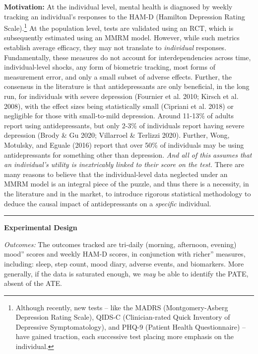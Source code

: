 \documentclass[12pt,letterpaper,doublespace, oneside]{article}
\begin{document}
\noindent\textbf{Motivation:} At the individual level, mental health is diagnosed by weekly tracking an individual’s responses to the HAM-D (Hamilton Depression Rating Scale).\footnote{Although recently, new tests -- like the MADRS (Montgomery-Asberg Depression Rating Scale), QIDS-C (Clinician-rated Quick Inventory of Depressive Symptomatology), and PHQ-9 (Patient Health Questionnaire) -- have gained traction, each successive test placing more emphasis on the individual.} At the population level, tests are validated using an RCT, which is subsequently estimated using an MMRM model. However, while such metrics establish average efficacy, they may not translate to \emph{individual} responses. Fundamentally, these measures do not account for interdependencies across time, individual-level shocks, any form of biometric tracking, most forms of measurement error, and only a small subset of adverse effects. Further, the consensus in the literature is that antidepressants are only beneficial, in the long run, for individuals with severe depression (Fournier et al. 2010; Kirsch et al. 2008), with the effect sizes being statistically small (Cipriani et al. 2018) or negligible for those with small-to-mild depression. Around 11-13\% of adults report using antidepressants, but only 2-3\% of individuals report having severe depression (Brody \& Gu 2020; Villarroel \& Terlizzi 2020). Further, Wong, Motulsky, and Eguale (2016) report that over 50\% of individuals may be using antidepressants for something other than depression. \emph{And all of this assumes that an individual’s utility is inextricably linked to their score on the test.} There are many reasons to believe that the individual-level data neglected under an MMRM model is an integral piece of the puzzle, and thus there is a necessity, in the literature and in the market, to introduce rigorous statistical methodology to deduce the causal impact of antidepressants on a \emph{specific} individual. 

\noindent\rule{\linewidth}{0.4pt}

\noindent
\textbf{Experimental Design} 

\emph{Outcomes:} The outcomes tracked are tri-daily (morning, afternoon, evening) mood'' scores and weekly HAM-D scores, in conjunction with richer'' measures, including: sleep, step count, mood diary, adverse events, and biomarkers. More generally, if the data is saturated enough, we \emph{may} be able to identify the PATE, absent of the ATE.

\noindent
\end{document}

